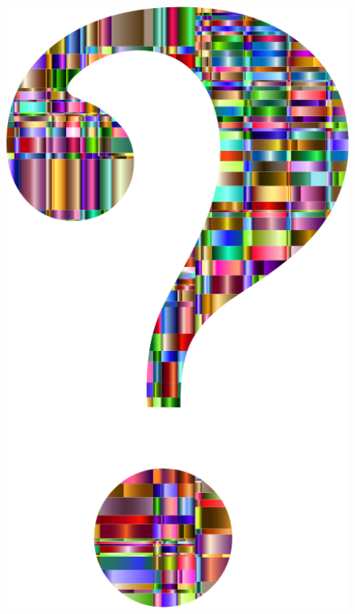 \documentclass[10pt]{beamer}
\begin{document}
{\1
\begin{frame}
	\begin{figure}[p]
		\centering
		\includegraphics[scale=0.1]{questionmark.png}
	\end{figure}
\end{frame}}
\end{document}
